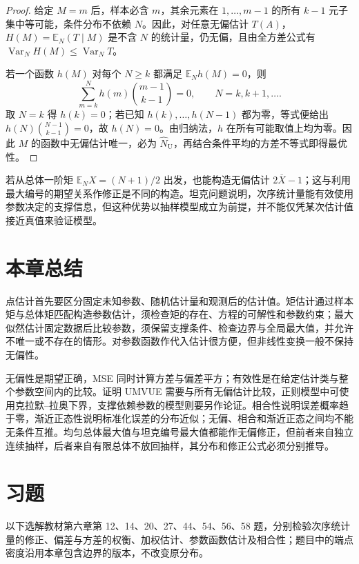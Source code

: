 \begin{proof}
给定 $M=m$ 后，样本必含 $m$，其余元素在 $1,\ldots,m-1$ 的所有 $k-1$ 元子集中等可能，条件分布不依赖 $N$。因此，对任意无偏估计 $T(A)$，$H(M)=\mathbb E_N(T\mid M)$ 是不含 $N$ 的统计量，仍无偏，且由全方差公式有 $\operatorname{Var}_N H(M)\le\operatorname{Var}_N T$。

若一个函数 $h(M)$ 对每个 $N\ge k$ 都满足 $\mathbb E_Nh(M)=0$，则
\[
  \sum_{m=k}^Nh(m)\binom{m-1}{k-1}=0,\qquad N=k,k+1,\ldots.
\]
取 $N=k$ 得 $h(k)=0$；若已知 $h(k),\ldots,h(N-1)$ 都为零，等式便给出 $h(N)\binom{N-1}{k-1}=0$，故 $h(N)=0$。由归纳法，$h$ 在所有可能取值上均为零。因此 $M$ 的函数中无偏估计唯一，必为 $\widehat N_{\mathrm U}$，再结合条件平均的方差不等式即得最优性。
\end{proof}

若从总体一阶矩 $\mathbb E_N X=(N+1)/2$ 出发，也能构造无偏估计 $2\overline X-1$；这与利用最大编号的期望关系作修正是不同的构造。坦克问题说明，次序统计量能有效使用参数决定的支撑信息，但这种优势以抽样模型成立为前提，并不能仅凭某次估计值接近真值来验证模型。

\section*{本章总结}

点估计首先要区分固定未知参数、随机估计量和观测后的估计值。矩估计通过样本矩与总体矩匹配构造参数估计，须检查矩的存在、方程的可解性和参数约束；最大似然估计固定数据后比较参数，须保留支撑条件、检查边界与全局最大值，并允许不唯一或不存在的情形。对参数函数作代入估计很方便，但非线性变换一般不保持无偏性。

无偏性是期望正确，MSE 同时计算方差与偏差平方；有效性是在给定估计类与整个参数空间内的比较。证明 UMVUE 需要与所有无偏估计比较，正则模型中可使用克拉默--拉奥下界，支撑依赖参数的模型则要另作论证。相合性说明误差概率趋于零，渐近正态性说明标准化误差的分布近似；无偏、相合和渐近正态之间均不能无条件互推。均匀总体最大值与坦克编号最大值都能作无偏修正，但前者来自独立连续抽样，后者来自有限总体不放回抽样，其分布和修正公式必须分别推导。

\section*{习题}

以下选解教材第六章第 12、14、20、27、44、54、56、58 题，分别检验次序统计量的修正、偏差与方差的权衡、加权估计、参数函数估计及相合性；题目中的端点密度沿用本章包含边界的版本，不改变原分布。

